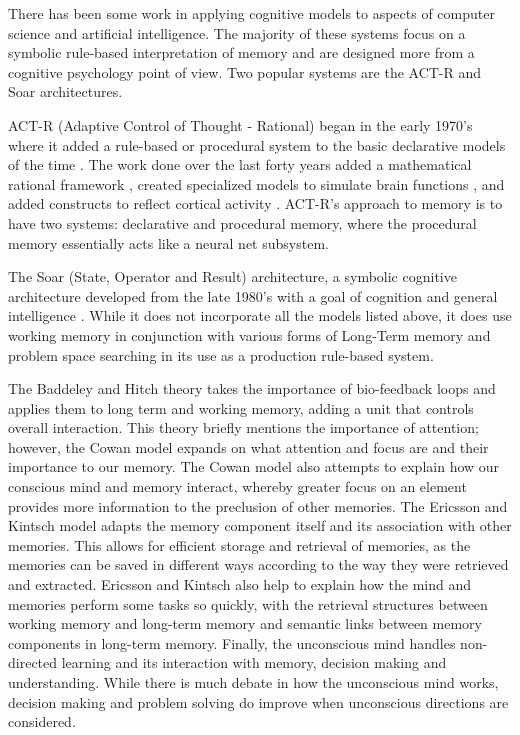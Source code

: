 There has been some work in applying cognitive models to aspects of computer science and
artificial intelligence.  The majority of these systems focus on a symbolic 
rule-based interpretation of memory and are designed more from a cognitive psychology 
point of view. Two popular systems are the ACT-R and Soar architectures.

ACT-R (Adaptive Control of Thought - Rational) began in the early 1970's where it added
a rule-based or procedural system to the basic declarative models of the time \cite{ACT-R}.
The work done over the last forty years added a mathematical rational framework \cite{ACT-R2}, 
created specialized models to simulate brain functions \cite{ACT-R3}, and added constructs
to reflect cortical activity \cite{ACT-R3}. ACT-R's approach to memory is to have two systems:
declarative and procedural memory, where the procedural memory essentially acts like a neural net 
subsystem.

The Soar (State, Operator and Result) architecture, a 
symbolic cognitive architecture developed from the late 1980's with a goal of cognition
and general intelligence \cite{SOAR}.
While it does not incorporate all the models listed above,
it does use working memory in conjunction with various forms of Long-Term memory and
problem space searching in its use as a production rule-based system\cite{SOAR2}. 

The Baddeley and Hitch
theory takes the importance of bio-feedback loops and applies them to long term
and working memory, adding a unit that controls overall interaction.  This
theory briefly mentions the importance of attention; however, the Cowan model
expands on what attention and focus are and their importance to our memory.
The Cowan model also attempts to explain how our conscious mind and memory
interact, whereby greater focus on an element provides more information to the
preclusion of other memories. The Ericsson and Kintsch model adapts the memory
component itself and its association with other memories. This allows for
efficient storage and retrieval of memories, as the memories can be saved in
different ways according to the way they were retrieved and extracted.  Ericsson
and Kintsch also help to explain how the mind and memories perform some tasks so
quickly, with the retrieval structures between working memory and long-term
memory and semantic links between memory components in long-term memory.
Finally, the unconscious mind handles non-directed learning and its interaction
with memory, decision making and understanding. While there is much debate in
how the unconscious mind works, decision making and problem solving do improve
when unconscious directions are considered.
